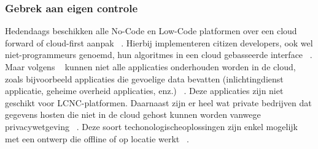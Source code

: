 \subsubsection*{Gebrek aan eigen controle}
\label{subsec:gebrek-aan-eigen-controle}
Hedendaags beschikken alle No-Code en Low-Code platformen over een cloud forward of cloud-first aanpak ~\autocite{Sufi_2023}.
Hierbij implementeren citizen developers, ook wel niet-programmeurs genoemd, hun algoritmes in een cloud gebasseerde interface ~\autocite{Sufi_2023}.
Maar volgens ~\textcite{Sufi_2023} kunnen niet alle applicaties onderhouden worden in de cloud, zoals bijvoorbeeld applicaties die gevoelige data bevatten (inlichtingdienst applicatie, geheime overheid applicaties, enz.) ~\autocite{Sufi_2023}.
Deze applicaties zijn niet geschikt voor LCNC-platformen. Daarnaast zijn er heel wat private bedrijven dat gegevens hosten die niet in de cloud gehost kunnen worden vanwege
privacywetgeving ~\autocite{Sufi_2023}. Deze soort techonologischeoplossingen zijn enkel mogelijk met een ontwerp die offline of op locatie werkt ~\autocite{Sufi_2023}.
